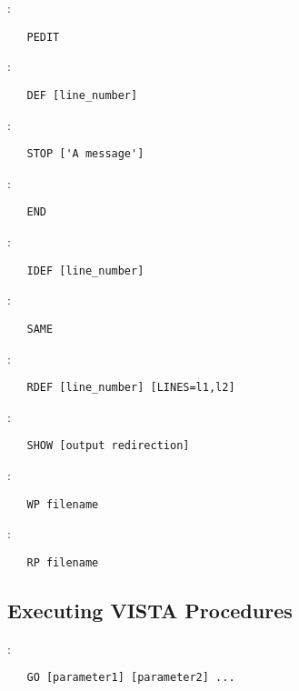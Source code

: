 :
\begin{verbatim}
   PEDIT
\end{verbatim}

\noindent {}:
\begin{verbatim}
   DEF [line_number]
\end{verbatim}

\noindent {}:
\begin{verbatim}
   STOP ['A message']
\end{verbatim}

\noindent {}:
\begin{verbatim}
   END
\end{verbatim}

\noindent {}:
\begin{verbatim}
   IDEF [line_number]
\end{verbatim}

\noindent {}:
\begin{verbatim}
   SAME
\end{verbatim}

\noindent {}:
\begin{verbatim}
   RDEF [line_number] [LINES=l1,l2]
\end{verbatim}

\noindent {}:
\begin{verbatim}
   SHOW [output redirection]
\end{verbatim}

\noindent {}:
\begin{verbatim}
   WP filename
\end{verbatim}

\noindent {}:
\begin{verbatim}
   RP filename
\end{verbatim}

\subsection{Executing VISTA Procedures}

:
\begin{verbatim}
   GO [parameter1] [parameter2] ...
\end{verbatim}

